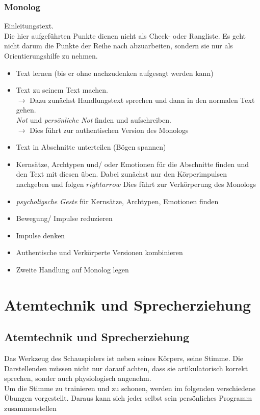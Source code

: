 \documentclass[ngerman, a4paper, twoside]{scrbook}%
\begin{document}
	\section{Monolog}
	Einleitungstext.\\
	Die hier aufgeführten Punkte dienen nicht als Check- oder Rangliste. Es geht nicht darum die Punkte der Reihe nach abzuarbeiten, sondern sie nur als Orientierungshilfe zu nehmen.

	\begin{itemize}
		\item Text lernen (bis er ohne nachzudenken aufgesagt werden kann)
		\item Text zu seinem Text machen.\\
		$\rightarrow$ Dazu zunächst Handlungstext sprechen und dann in den normalen Text gehen.\\
		\emph{Not} und \emph{persönliche Not} finden und aufschreiben.\\
		$\rightarrow$ Dies führt zur authentischen Version des Monologs
		\item Text in Abschnitte unterteilen (Bögen spannen)
		\item Kernsätze, Archtypen und/ oder Emotionen für die Abschnitte finden und den Text mit diesen üben. Dabei zunächst nur den Körperimpulsen nachgeben und folgen $rightarrow$ Dies führt zur Verkörperung des Monologs
		\item \emph{psycholigsche Geste} für Kernsätze, Archtypen, Emotionen finden
		\item Bewegung/ Impulse reduzieren
		\item Impulse denken
		\item Authentische und Verkörperte Versionen kombinieren
		\item Zweite Handlung auf Monolog legen
	\end{itemize}



	\setcounter{chapter}{0}
	\setcounter{section}{0}
	\part{Atemtechnik und Sprecherziehung}
	\chapter{Atemtechnik und Sprecherziehung}
	Das Werkzeug des Schauspielers ist neben seines Körpers, seine Stimme. Die Darstellenden müssen nicht nur darauf achten, dass sie artikulatorisch korrekt sprechen, sonder auch physiologisch angenehm.\\
	Um die Stimme zu trainieren und zu schonen, werden im folgenden verschiedene Übungen vorgestellt. Daraus kann sich jeder selbst sein persönliches Programm zusammenstellen
\end{document}
